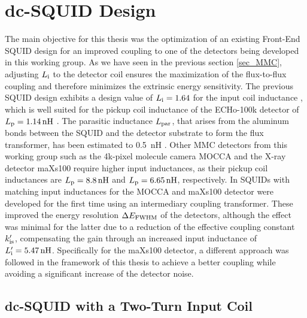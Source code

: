 \chapter{dc-SQUID Design} \label{ch_SQUIDdesign}

The main objective for this thesis was the optimization of an existing Front-End SQUID design for an improved coupling to one of the detectors being developed in this working group. As we have seen in the previous section \ref{sec_MMC}, adjusting $L_{\rm i}$ to the detector coil ensures the maximization of the flux-to-flux coupling and therefore minimizes the extrinsic energy sensitivity. The previous SQUID design exhibits a design value of $L_{\rm i}=1.64$ for the input coil inductance \cite{Bauer2022}, which is well suited for the pickup coil inductance of the ECHo-100k detector of $L_{\rm p}=\qty{1.14}{\nano\henry}$ \cite{Mantegazzini2021}. The parasitic inductance $L_{\rm par}$, that arises from the aluminum bonds between the SQUID and the detector substrate to form the flux transformer, has been estimated to \qty{0.5}{\nano\henry} \cite{Hengstler2017}. Other MMC detectors from this working group such as the 4k-pixel molecule camera MOCCA and the X-ray detector maXs100 require higher input inductances, as their pickup coil inductances are $L_{\rm p}=\qty{8.8}{\nano\henry}$ and $L_{\rm p}=\qty{6.65}{\nano\henry}$, respectively. In \cite{Bauer2022} SQUIDs with matching input inductances for the MOCCA and maXs100 detector were developed for the first time using an intermediary coupling transformer. These improved the energy resolution $\Delta E_{\rm FWHM}$ of the detectors, although the effect was minimal for the latter due to a reduction of the effective coupling constant $k_{\rm is}'$, compensating the gain through an increased input inductance of $L_{\rm i}'=\qty{5.47}{\nano\henry}$. Specifically for the maXs100 detector, a different approach was followed in the framework of this thesis to achieve a better coupling while avoiding a significant increase of the detector noise.  

\section{dc-SQUID with a Two-Turn Input Coil} \label{sec_FEdesign}

